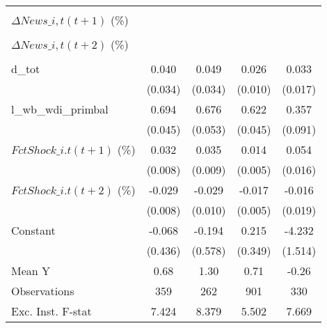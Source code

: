 {\begin{tabular}{l*{4}{c}}
                    &                     &                     &                     &                     \\
\addlinespace
$ \Delta News\_{i,t}(t+1)$ (\%)&                     &                     &                     &                     \\
                    &                     &                     &                     &                     \\
\addlinespace
$ \Delta News\_{i,t}(t+2)$ (\%)&                     &                     &                     &                     \\
                    &                     &                     &                     &                     \\
\addlinespace
d\_tot               &       0.040         &       0.049         &       0.026\sym{**} &       0.033\sym{*}  \\
                    &     (0.034)         &     (0.034)         &     (0.010)         &     (0.017)         \\
\addlinespace
l\_wb\_wdi\_primbal    &       0.694\sym{***}&       0.676\sym{***}&       0.622\sym{***}&       0.357\sym{***}\\
                    &     (0.045)         &     (0.053)         &     (0.045)         &     (0.091)         \\
\addlinespace
$ FctShock\_{i.t}(t+1)$ (\%)&       0.032\sym{***}&       0.035\sym{***}&       0.014\sym{***}&       0.054\sym{***}\\
                    &     (0.008)         &     (0.009)         &     (0.005)         &     (0.016)         \\
\addlinespace
$ FctShock\_{i.t}(t+2)$ (\%)&      -0.029\sym{***}&      -0.029\sym{**} &      -0.017\sym{***}&      -0.016         \\
                    &     (0.008)         &     (0.010)         &     (0.005)         &     (0.019)         \\
\addlinespace
Constant            &      -0.068         &      -0.194         &       0.215         &      -4.232\sym{***}\\
                    &     (0.436)         &     (0.578)         &     (0.349)         &     (1.514)         \\
\midrule
Mean Y              &        0.68         &        1.30         &        0.71         &       -0.26         \\
Observations        &         359         &         262         &         901         &         330         \\
Exc. Inst. F-stat   &       7.424         &       8.379         &       5.502         &       7.669         \\
\bottomrule
\end{tabular}
}
